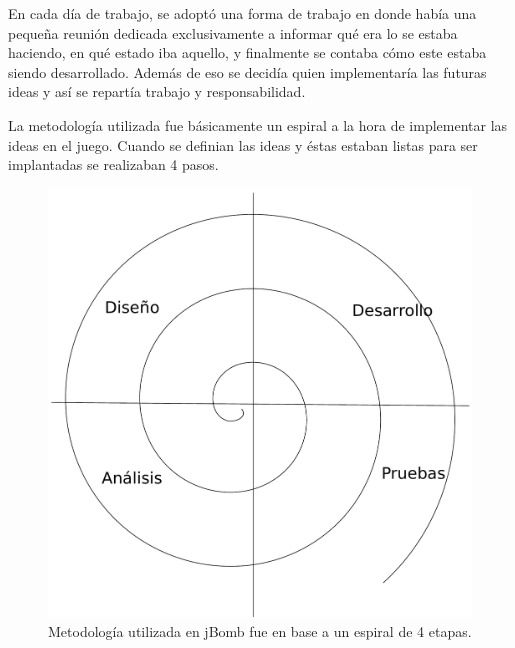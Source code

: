 \documentclass[a4paper,12pt,openany,oneside]{book}
\begin{document}
En cada día de trabajo, se adoptó una forma de trabajo en donde había una pequeña reunión dedicada exclusivamente a informar qué era lo se estaba haciendo, en qué estado iba aquello, y finalmente se contaba cómo este estaba siendo desarrollado. Además de eso se decidía quien implementaría las futuras ideas y así se repartía trabajo y responsabilidad.

La metodología utilizada fue básicamente un espiral a la hora de implementar las ideas en el juego. Cuando se definian las ideas y éstas estaban listas para ser implantadas se realizaban 4 pasos.

\begin{figure}
\begin{center}
\includegraphics[scale=.4]{espiral.pdf} 
\end{center}
\caption[Metodología en espiral]{Metodología utilizada en jBomb fue en base a un espiral de 4 etapas.}
\end{figure}
\end{document}
